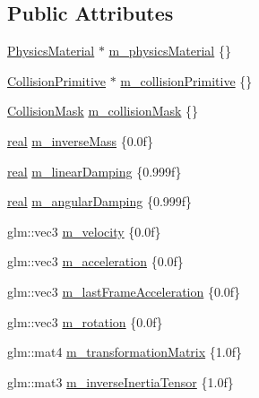\subsection*{Public Attributes}
\begin{DoxyCompactItemize}
\item 
\mbox{\hyperlink{classr3_1_1_physics_material}{Physics\+Material}} $\ast$ \mbox{\hyperlink{structr3_1_1_rigid_body_def_aac57d02886c87fe1ed72d0b0794f74e6}{m\+\_\+physics\+Material}} \{\}
\item 
\mbox{\hyperlink{classr3_1_1_collision_primitive}{Collision\+Primitive}} $\ast$ \mbox{\hyperlink{structr3_1_1_rigid_body_def_a99f08504496b3687836a7b912086618f}{m\+\_\+collision\+Primitive}} \{\}
\item 
\mbox{\hyperlink{structr3_1_1_collision_mask}{Collision\+Mask}} \mbox{\hyperlink{structr3_1_1_rigid_body_def_af5bb8006b04822cc98d4c29992ba29b1}{m\+\_\+collision\+Mask}} \{\}
\item 
\mbox{\hyperlink{namespacer3_ab2016b3e3f743fb735afce242f0dc1eb}{real}} \mbox{\hyperlink{structr3_1_1_rigid_body_def_a8f5ffeb5e6a8f397e63623f7cd03ebe9}{m\+\_\+inverse\+Mass}} \{0.\+0f\}
\item 
\mbox{\hyperlink{namespacer3_ab2016b3e3f743fb735afce242f0dc1eb}{real}} \mbox{\hyperlink{structr3_1_1_rigid_body_def_afe2d4cfd2d576be94dbabdd415883e3b}{m\+\_\+linear\+Damping}} \{0.\+999f\}
\item 
\mbox{\hyperlink{namespacer3_ab2016b3e3f743fb735afce242f0dc1eb}{real}} \mbox{\hyperlink{structr3_1_1_rigid_body_def_a8510aa8449a8657803d41aa0d1560108}{m\+\_\+angular\+Damping}} \{0.\+999f\}
\item 
glm\+::vec3 \mbox{\hyperlink{structr3_1_1_rigid_body_def_a3acdc6c652745324b72165c6fc42bc39}{m\+\_\+velocity}} \{0.\+0f\}
\item 
glm\+::vec3 \mbox{\hyperlink{structr3_1_1_rigid_body_def_a7f198090401ced879b2e8f8b5baa2a4d}{m\+\_\+acceleration}} \{0.\+0f\}
\item 
glm\+::vec3 \mbox{\hyperlink{structr3_1_1_rigid_body_def_a5c23bea5e32b01e7182b633126fe3d98}{m\+\_\+last\+Frame\+Acceleration}} \{0.\+0f\}
\item 
glm\+::vec3 \mbox{\hyperlink{structr3_1_1_rigid_body_def_a141b8dc66b5bde2f7bb98894313b2e99}{m\+\_\+rotation}} \{0.\+0f\}
\item 
glm\+::mat4 \mbox{\hyperlink{structr3_1_1_rigid_body_def_a5110c4790357fbbfad4d5cc5dd89c4d6}{m\+\_\+transformation\+Matrix}} \{1.\+0f\}
\item 
glm\+::mat3 \mbox{\hyperlink{structr3_1_1_rigid_body_def_a74a00d333ee64b54e8481e7733999006}{m\+\_\+inverse\+Inertia\+Tensor}} \{1.\+0f\}

\end{DoxyCompactItemize}
